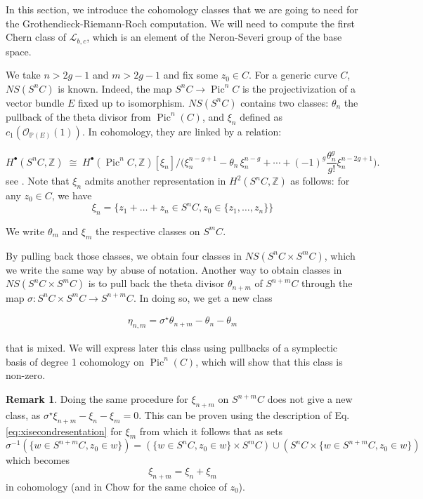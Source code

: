 \documentclass{article}
\theoremstyle{definition}
\newcounter{sharedcounter}[section]
\newtheorem{remark}[sharedcounter]{Remark}
\DeclareMathOperator{\pic}{\text{Pic}}
\newcommand{\eqtag}[3][1]{
\begin{equation}
   \label{#3}
	\begin{alignedat}{#1}
	#2
	\end{alignedat}
\end{equation}
}
\begin{document}
In this section, we introduce the cohomology classes that we are going to need for the Grothendieck-Riemann-Roch computation. We will need to compute the first Chern class of $\mathcal{L}_{b,c}$, which is an element of the Neron-Severi group of the base space.

We take $n>2g-1$ and $m>2g-1$ and fix some $z_0 \in C$.
For a generic curve $C$, $NS(S^n C)$ is known. Indeed, the map $S^n C \to \pic^nC$ is the projectivization of a vector bundle $E$ fixed up to isomorphism. $NS(S^n C)$  contains two classes: $\theta_n$ the pullback of the theta divisor from $\pic^n(C)$, and $\xi_n$  defined as $c_1(\mathcal{O}_{\mathbb{P}(E)}(1))$. In cohomology, they are linked by a relation: 

\[
        H^\bullet(S^n C,\mathbb{Z})
        \;\cong\;
        H^\bullet(\pic^n C,\mathbb{Z})[\xi_n]
        \Big/
        \bigl(\xi_n^{n-g+1} -\theta_n \,\xi_n^{n-g} + \cdots + (-1)^g \frac{\theta_n^g}{g!} \xi_n^{n-2g+1}\bigr).
\]
see \cite[Ch. 7]{Griffiths_book}.
Note that $\xi_n$ admits another representation in $H^2(S^n C,\mathbb{Z})$ as follows: for any $z_0 \in C$, we have
\begin{equation}
\label{eq:xisecondresentation}
    \xi_n=\lbrace z_1+\dots+z_n \in S^n C, z_0 \in \lbrace z_1,\dots,z_n\rbrace \rbrace
\end{equation}



We write $\theta_m$ and $\xi_m$ the respective classes on $S^mC$.

By pulling back those classes, we obtain four classes in $NS(S^n C \times S^m C)$, which we write the same way by abuse of notation. 
Another way to obtain classes in $NS(S^n C \times S^m C)$ is to pull back the theta divisor $\theta_{n+m}$ of $S^{n+m} C$ through the map $\sigma: S^n C \times S^m C \to S^{n+m} C$. In  doing so, we get a new class 
\eqtag{
    \eta_{n,m}=\sigma^\star \theta_{n+m} -\theta_n- \theta_m
}{eq:pullbacktheta} 
 that is mixed. We will express later this class using pullbacks of a symplectic basis of degree 1 cohomology on $\pic^{n}(C)$, which will show that this class is non-zero. 
 
\begin{remark}
Doing the same procedure for $\xi_{n+m}$ on $S^{n+m} C$ does not give a new class, as $\sigma^\star \xi_{n+m}-\xi_n-\xi_m=0$. This can be proven using the description of Eq. \eqref{eq:xisecondresentation} for $\xi_m$ from which it follows that as sets  $$\sigma^{-1} \left(\lbrace w \in S^{n+m} C, z_0 \in w \rbrace\right)=\left(\lbrace w \in S^{n} C, z_0 \in w \rbrace \times S^m C \right) \cup \left(S^n C \times \lbrace w \in S^{n+m} C, z_0 \in w \rbrace\right)$$ which becomes $$\xi_{n+m}=\xi_n+\xi_m$$ in cohomology (and in Chow for the same choice of $z_0$).

 \end{remark}
\end{document}
